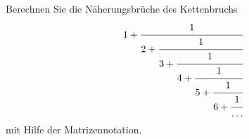 Berechnen Sie die Näherungsbrüche des Kettenbruchs
\[
1+\cfrac{1}{2+\cfrac{1}{3+\cfrac{1}{4+\cfrac{1}{5+\cfrac{1}{6+\cfrac{1}{\dots}}}}}}
\]
mit Hilfe der Matrizennotation.

\begin{loesung}
\end{loesung}

